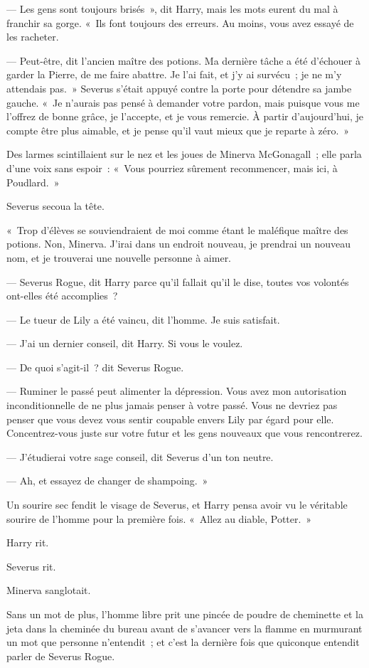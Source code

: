 --- Les gens sont toujours brisés~», dit Harry, mais les mots eurent du mal à franchir sa gorge.
«~Ils font toujours des erreurs.
Au moins, vous avez essayé de les racheter.

--- Peut-être, dit l'ancien maître des potions.
Ma dernière tâche a été d'échouer à garder la Pierre, de me faire abattre.
Je l'ai fait, et j'y ai survécu~; je ne m'y attendais pas.~»
Severus s'était appuyé contre la porte pour détendre sa jambe gauche.
«~Je n'aurais pas pensé à demander votre pardon, mais puisque vous me l'offrez de bonne grâce, je l'accepte, et je vous remercie.
À partir d'aujourd'hui, je compte être plus aimable, et je pense qu'il vaut mieux que je reparte à zéro.~»

Des larmes scintillaient sur le nez et les joues de Minerva McGonagall~; elle parla d'une voix sans espoir~: «~Vous pourriez sûrement recommencer, mais ici, à Poudlard.~»

Severus secoua la tête.

«~Trop d'élèves se souviendraient de moi comme étant le maléfique maître des potions.
Non, Minerva.
J'irai dans un endroit nouveau, je prendrai un nouveau nom, et je trouverai une nouvelle personne à aimer.

--- Severus Rogue, dit Harry parce qu'il fallait qu'il le dise, toutes vos volontés ont-elles été accomplies~?

--- Le tueur de Lily a été vaincu, dit l'homme.
Je suis satisfait.

--- J'ai un dernier conseil, dit Harry.
Si vous le voulez.

--- De quoi s'agit-il~? dit Severus Rogue.

--- Ruminer le passé peut alimenter la dépression.
Vous avez mon autorisation inconditionnelle de ne plus jamais penser à votre passé.
Vous ne devriez pas penser que vous devez vous sentir coupable envers Lily par égard pour elle.
Concentrez-vous juste sur votre futur et les gens nouveaux que vous rencontrerez.

--- J'étudierai votre sage conseil, dit Severus d'un ton neutre.

--- Ah, et essayez de changer de shampoing.~»

Un sourire sec fendit le visage de Severus, et Harry pensa avoir vu le véritable sourire de l'homme pour la première fois.
«~Allez au diable, Potter.~»

Harry rit.

Severus rit.

Minerva sanglotait.

Sans un mot de plus, l'homme libre prit une pincée de poudre de cheminette et la jeta dans la cheminée du bureau avant de s'avancer vers la flamme en murmurant un mot que personne n'entendit~; et c'est la dernière fois que quiconque entendit parler de Severus Rogue.
